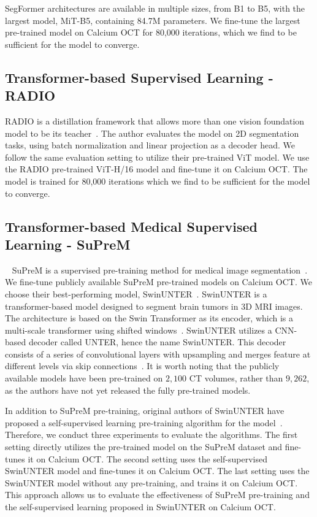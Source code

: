 \documentclass[a4paper,11pt,oneside]{report}
\begin{document}
SegFormer architectures are available in multiple sizes, from B1 to B5, with the largest model, MiT-B5, containing 84.7M parameters. We fine-tune the largest pre-trained model on Calcium OCT for 80,000 iterations, which we find to be sufficient for the model to converge.

\subsection{Transformer-based Supervised Learning - RADIO}
RADIO is a distillation framework that allows more than one vision foundation model to be its teacher~\cite{Ranzinger2024RADIO}. The author evaluates the model on 2D segmentation tasks, using batch normalization and linear projection as a decoder head. We follow the same evaluation setting to utilize their pre-trained ViT model. We use the RADIO pre-trained ViT-H/16 model and fine-tune it on Calcium OCT. The model is trained for 80,000 iterations which we find to be sufficient for the model to converge.

\subsection{Transformer-based Medical Supervised Learning - SuPreM}~\label{sec:design:suprem}
SuPreM is a supervised pre-training method for medical image segmentation~\cite{Li2024}. We fine-tune publicly available SuPreM pre-trained models on Calcium OCT. We choose their best-performing model, SwinUNTER~\cite{Tang2022}. SwinUNTER is a transformer-based model designed to segment brain tumors in 3D MRI images. The architecture is based on the Swin Transformer as its encoder, which is a multi-scale transformer using shifted windows~\cite{Liu2021Swin}. SwinUNTER utilizes a CNN-based decoder called UNTER, hence the name SwinUNTER. This decoder consists of a series of convolutional layers with upsampling and merges feature at different levels via skip connections~\cite{Hatamizadeh2022}. It is worth noting that the publicly available models have been pre-trained on $2,100$ CT volumes, rather than $9,262$, as the authors have not yet released the fully pre-trained models.

In addition to SuPreM pre-training, original authors of SwinUNTER have proposed a self-supervised learning pre-training algorithm for the model~\cite{Tang2022}. Therefore, we conduct three experiments to evaluate the algorithms. The first setting directly utilizes the pre-trained model on the SuPreM dataset and fine-tunes it on Calcium OCT. The second setting uses the self-supervised SwinUNTER model and fine-tunes it on Calcium OCT. The last setting uses the SwinUNTER model without any pre-training, and trains it on Calcium OCT. This approach allows us to evaluate the effectiveness of SuPreM pre-training and the self-supervised learning proposed in SwinUNTER on Calcium OCT.
\end{document}
